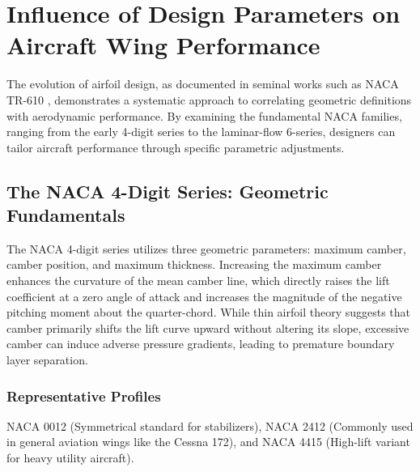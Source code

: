 \section*{Influence of Design Parameters on Aircraft Wing Performance}

The evolution of airfoil design, 
as documented in seminal works such as NACA TR-610 \cite{NACA_TR_610}, 
demonstrates a systematic approach to correlating geometric definitions with aerodynamic performance. 
By examining the fundamental NACA families, 
ranging from the early 4-digit series to the laminar-flow 6-series, 
designers can tailor aircraft performance through specific parametric adjustments.


\subsection*{The NACA 4-Digit Series: Geometric Fundamentals}

The NACA 4-digit series utilizes three geometric parameters: maximum camber, camber position, and maximum thickness. 
Increasing the maximum camber enhances the curvature of the mean camber line, 
which directly raises the lift coefficient at a zero angle of attack and increases the magnitude of the negative pitching moment about the quarter-chord. 
While thin airfoil theory suggests that camber primarily shifts the lift curve upward without altering its slope, 
excessive camber can induce adverse pressure gradients, 
leading to premature boundary layer separation.


\subsubsection*{Representative Profiles}
NACA 0012 (Symmetrical standard for stabilizers), 
NACA 2412 (Commonly used in general aviation wings like the Cessna 172), 
and NACA 4415 (High-lift variant for heavy utility aircraft).


